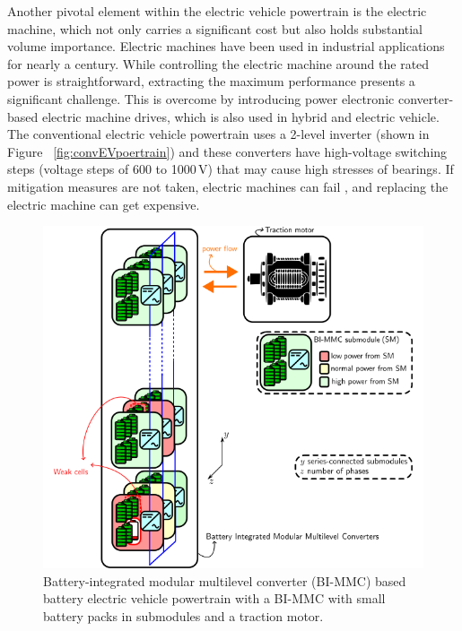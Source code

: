 \documentclass{article}
\begin{document}
Another pivotal element within the electric vehicle powertrain is the electric machine, which not only carries a significant cost but also holds substantial volume importance. Electric machines have been used in industrial applications for nearly a century. While controlling the electric machine around the rated power is straightforward, extracting the maximum performance presents a significant challenge. This is overcome by introducing power electronic converter-based electric machine drives, which is also used in hybrid and electric vehicle. The conventional electric vehicle powertrain uses a 2-level inverter (shown in Figure ~\ref{fig:convEVpoertrain}) and these converters have high-voltage switching steps (voltage steps of 600 to 1000\,V) that may cause high stresses of bearings. If mitigation measures are not taken, electric machines can fail \cite{bell2001experience}, and replacing the electric machine can get expensive. 
\begin{figure}[!b]
    \centering
    \includegraphics[width=\textwidth]{Figures/BI_MMC_powertrain.png}
    \caption{Battery-integrated modular multilevel converter (BI-MMC) based battery electric vehicle powertrain with a BI-MMC with small battery packs in submodules and a traction motor.}
    \label{fig:BIMMCpoertrain}
\end{figure}
\end{document}
